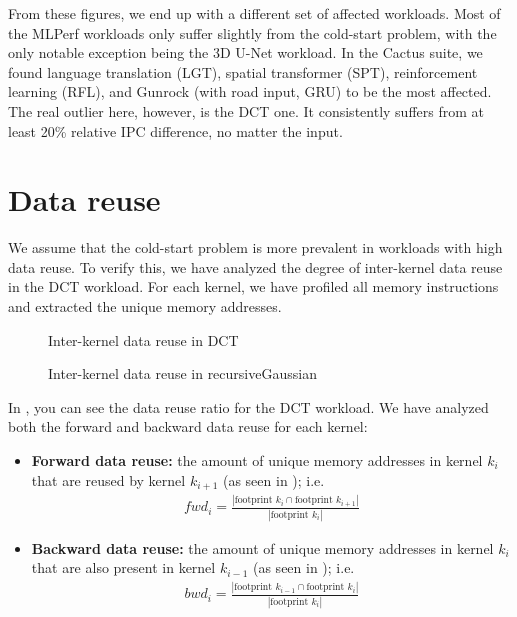 From these figures, we end up with a different set of affected workloads.
Most of the MLPerf workloads only suffer slightly from the cold-start problem, with the only notable exception being the 3D U-Net workload.
In the Cactus suite, we found language translation (LGT), spatial transformer (SPT), reinforcement learning (RFL), and Gunrock (with road input, GRU) to be the most affected.
The real outlier here, however, is the DCT one.
It consistently suffers from at least 20\% relative IPC difference, no matter the input.

\FloatBarrier

\section{Data reuse}\label{sec:data-reuse}
We assume that the cold-start problem is more prevalent in workloads with high data reuse.
To verify this, we have analyzed the degree of inter-kernel data reuse in the DCT workload.
For each kernel, we have profiled all memory instructions and extracted the unique memory addresses.

\begin{figure}[htb]
    \centering
    \caption{Inter-kernel data reuse in DCT}
    \label{fig:dct_reuse}
\end{figure}

\begin{figure}[hbt]
    \centering
    \caption{Inter-kernel data reuse in recursiveGaussian}
    \label{fig:recg_reuse}
\end{figure}

In , you can see the data reuse ratio for the DCT workload.
We have analyzed both the forward and backward data reuse for each kernel:
\begin{itemize}
    \item \textbf{Forward data reuse:} the amount of unique memory addresses in kernel $k_{i}$ that are reused by kernel $k_{i+1}$ (as seen in ); i.e.
    \begin{align}
        fwd_i = \frac{|\text{footprint } k_{i} \cap \text{footprint } k_{i+1}|}{|\text{footprint } k_{i}|}
    \end{align}
    \item \textbf{Backward data reuse:} the amount of unique memory addresses in kernel $k_{i}$ that are also present in kernel $k_{i-1}$ (as seen in ); i.e.
    \begin{align}
        bwd_i = \frac{|\text{footprint } k_{i-1} \cap \text{footprint } k_i|}{|\text{footprint } k_i|}
    \end{align}
\end{itemize}

